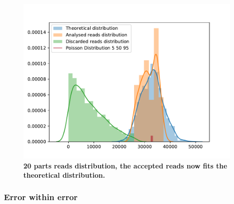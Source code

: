 \documentclass[11pt, a4paper]{article}
\begin{document}
\begin{figure}[ht]
    \begin{center}
    \includegraphics[width=1\textwidth]{../results/images_notebook/v_310/20_parts_distribution.pdf}
    \end{center}
    \caption{{\bf 20 parts reads distribution, the accepted reads now fits the theoretical distribution. }}
   \label{fig:v_310_reads_20_parts}
\end{figure}

 
\subsubsection{Error within error }
\end{document}
